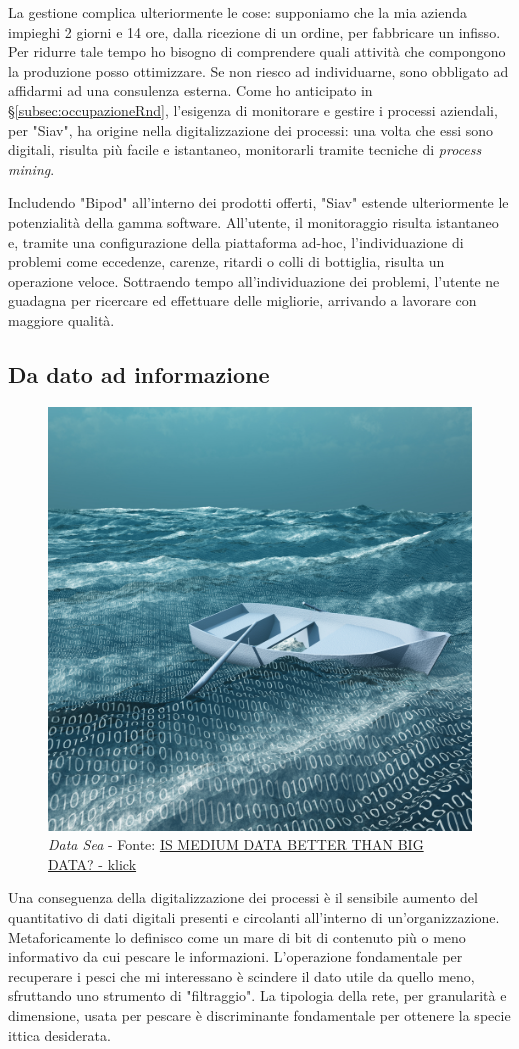 La gestione complica ulteriormente le cose: supponiamo che la mia azienda impieghi 2 giorni e 14 ore, dalla ricezione di un ordine, per fabbricare un infisso. Per ridurre tale tempo ho bisogno di comprendere quali attività che compongono la produzione posso ottimizzare. Se non riesco ad individuarne, sono obbligato ad affidarmi ad una consulenza esterna.
Come ho anticipato in \S\ref{subsec:occupazioneRnd}, l'esigenza di monitorare e gestire i processi aziendali, per "Siav", ha origine nella digitalizzazione dei processi: una volta che essi sono digitali, risulta più facile e istantaneo, monitorarli tramite tecniche di \textit{process mining}.

Includendo "Bipod" all'interno dei prodotti offerti, "Siav" estende ulteriormente le potenzialità della gamma software.
All'utente, il monitoraggio risulta istantaneo e, tramite una configurazione della piattaforma ad-hoc, l'individuazione di problemi come eccedenze, carenze, ritardi o colli di bottiglia, risulta un operazione veloce. Sottraendo tempo all'individuazione dei problemi, l'utente ne guadagna per ricercare ed effettuare delle migliorie, arrivando a lavorare con maggiore qualità.

\subsection{Da dato ad informazione}
\begin{figure}[H]
    \centering
    \includegraphics[width=0.50\columnwidth]{immagini/bigData.jpg}
    \caption{\textit{Data Sea} - Fonte: \href{https://www.klick.com/health/news/blog/strategy/is-medium-data-better-than-big-data/}{IS MEDIUM DATA BETTER THAN BIG DATA? - klick}}
    \label{fig:dataSea}
\end{figure}

Una conseguenza della digitalizzazione dei processi è il sensibile aumento del quantitativo di dati digitali presenti e circolanti all'interno di un'organizzazione. Metaforicamente lo definisco come un mare di bit di contenuto più o meno informativo da cui pescare le informazioni. L'operazione fondamentale per recuperare i pesci che mi interessano è scindere il dato utile da quello meno, sfruttando uno strumento di "filtraggio".
La tipologia della rete, per granularità e dimensione, usata per pescare è discriminante fondamentale per ottenere la specie ittica desiderata.
